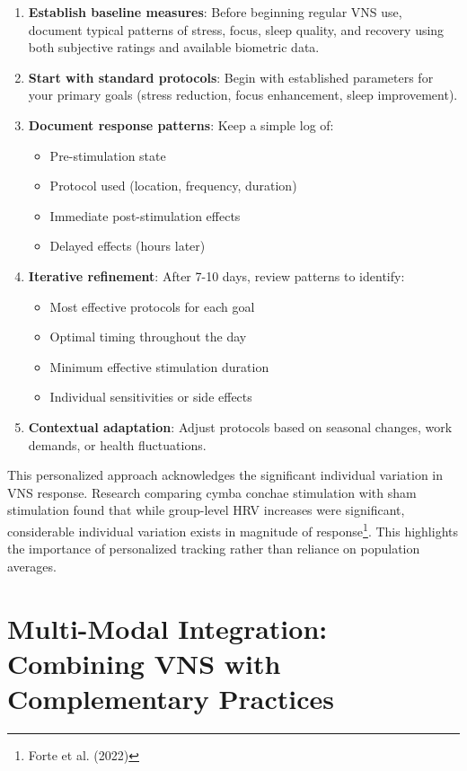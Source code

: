\documentclass[
  Letterpaper,
]{scrbook}
\providecommand{\tightlist}{%
  \setlength{\itemsep}{0pt}\setlength{\parskip}{0pt}}\usepackage{longtable,booktabs,array}
\begin{document}
\begin{enumerate}
\def\labelenumi{\arabic{enumi}.}
\item
  \textbf{Establish baseline measures}: Before beginning regular VNS
  use, document typical patterns of stress, focus, sleep quality, and
  recovery using both subjective ratings and available biometric data.
\item
  \textbf{Start with standard protocols}: Begin with established
  parameters for your primary goals (stress reduction, focus
  enhancement, sleep improvement).
\item
  \textbf{Document response patterns}: Keep a simple log of:

  \begin{itemize}
  \tightlist
  \item
    Pre-stimulation state
  \item
    Protocol used (location, frequency, duration)
  \item
    Immediate post-stimulation effects
  \item
    Delayed effects (hours later)
  \end{itemize}
\item
  \textbf{Iterative refinement}: After 7-10 days, review patterns to
  identify:

  \begin{itemize}
  \tightlist
  \item
    Most effective protocols for each goal
  \item
    Optimal timing throughout the day
  \item
    Minimum effective stimulation duration
  \item
    Individual sensitivities or side effects
  \end{itemize}
\item
  \textbf{Contextual adaptation}: Adjust protocols based on seasonal
  changes, work demands, or health fluctuations.
\end{enumerate}

This personalized approach acknowledges the significant individual
variation in VNS response. Research comparing cymba conchae stimulation
with sham stimulation found that while group-level HRV increases were
significant, considerable individual variation exists in magnitude of
response\footnote{Forte et al. (2022)}. This highlights the importance
of personalized tracking rather than reliance on population averages.

\section{Multi-Modal Integration: Combining VNS with Complementary
Practices}\label{multi-modal-integration-combining-vns-with-complementary-practices}
\end{document}
